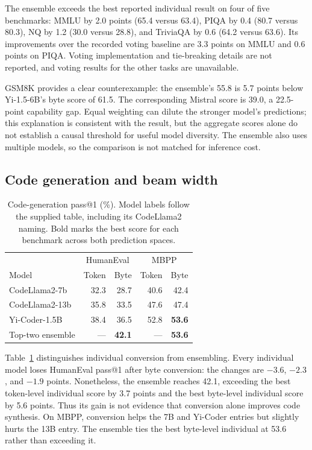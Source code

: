 \documentclass{article}
\begin{document}
The ensemble exceeds the best reported individual result on four of five benchmarks: MMLU by 2.0 points (65.4 versus 63.4), PIQA by 0.4 (80.7 versus 80.3), NQ by 1.2 (30.0 versus 28.8), and TriviaQA by 0.6 (64.2 versus 63.6). Its improvements over the recorded voting baseline are 3.3 points on MMLU and 0.6 points on PIQA. Voting implementation and tie-breaking details are not reported, and voting results for the other tasks are unavailable.

GSM8K provides a clear counterexample: the ensemble's 55.8 is 5.7 points below Yi-1.5-6B's byte score of 61.5. The corresponding Mistral score is 39.0, a 22.5-point capability gap. Equal weighting can dilute the stronger model's predictions; this explanation is consistent with the result, but the aggregate scores alone do not establish a causal threshold for useful model diversity. The ensemble also uses multiple models, so the comparison is not matched for inference cost.

\subsection{Code generation and beam width}
\begin{table}[t]
\caption{Code-generation pass@1 (\%). Model labels follow the supplied table, including its CodeLlama2 naming. Bold marks the best score for each benchmark across both prediction spaces.}
\label{tab:code}
\centering
\begin{tabular}{lrrrr}
\toprule
 & \multicolumn{2}{c}{HumanEval} & \multicolumn{2}{c}{MBPP} \\
Model & Token & Byte & Token & Byte \\
\midrule
CodeLlama2-7b & 32.3 & 28.7 & 40.6 & 42.4 \\
CodeLlama2-13b & 35.8 & 33.5 & 47.6 & 47.4 \\
Yi-Coder-1.5B & 38.4 & 36.5 & 52.8 & \textbf{53.6} \\
Top-two ensemble & --- & \textbf{42.1} & --- & \textbf{53.6} \\
\bottomrule
\end{tabular}
\end{table}

Table~\ref{tab:code} distinguishes individual conversion from ensembling. Every individual model loses HumanEval pass@1 after byte conversion: the changes are $-3.6$, $-2.3$, and $-1.9$ points. Nonetheless, the ensemble reaches 42.1, exceeding the best token-level individual score by 3.7 points and the best byte-level individual score by 5.6 points. Thus its gain is not evidence that conversion alone improves code synthesis. On MBPP, conversion helps the 7B and Yi-Coder entries but slightly hurts the 13B entry. The ensemble ties the best byte-level individual at 53.6 rather than exceeding it.
\end{document}
